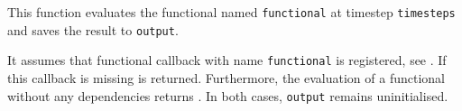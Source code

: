 This function evaluates the functional named \texttt{functional} at timestep \texttt{timesteps} and saves the result to \texttt{output}.

It assumes that functional callback with name \texttt{functional} is registered, see . 
If this callback is missing  is returned.
Furthermore, the evaluation of a functional without any dependencies returns . 
In both cases, \texttt{output} remains uninitialised.

